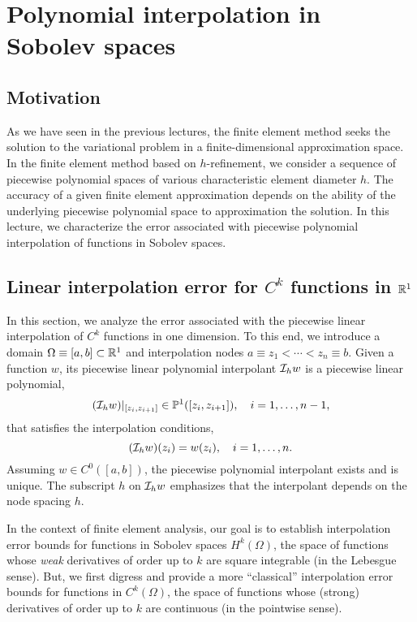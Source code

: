 \chapter{Polynomial interpolation in Sobolev spaces}

\section{Motivation}
As we have seen in the previous lectures, the finite element method seeks the solution to the variational problem in a finite-dimensional approximation space.  In the finite element method based on $h$-refinement, we consider a sequence of piecewise polynomial spaces of various characteristic element diameter $h$.  The accuracy of a given finite element approximation depends on the ability of the underlying piecewise polynomial space to approximation the solution.  In this lecture, we characterize the error associated with piecewise polynomial interpolation of functions in Sobolev spaces.  %


\section{Linear interpolation error for $C^k$ functions in $\mathbb{R}^1$}

\label{sec:fe_interp_1d}
In this section, we analyze the error associated with the piecewise linear interpolation of $C^k$ functions in one dimension. To this end, we introduce a domain $\Omega \equiv [a,b] \subset \mathbb{R}^1$ and interpolation nodes $a \equiv z_1 < \cdots < z_n \equiv b$.  Given a function $w$, its piecewise linear polynomial interpolant $\mathcal{I}_h w$ is a piecewise linear polynomial,
\begin{equation*}
  (\mathcal{I}_h w)|_{[z_i,z_{i+1}]} \in \mathbb{P}^1([z_i,z_{i+1}]), \quad i = 1,\dots,n-1,
\end{equation*}
that satisfies the interpolation conditions,
\begin{equation*}
  (\mathcal{I}_h w)(z_i) = w(z_i), \quad i = 1,\dots,n.
\end{equation*}
Assuming $w \in C^0([a,b])$, the piecewise polynomial interpolant exists and is unique.  The subscript $h$ on $\mathcal{I}_h w$ emphasizes that the interpolant depends on the node spacing $h$.

In the context of finite element analysis,  our goal is to establish interpolation error bounds for functions in Sobolev spaces $H^k(\Omega)$, the space of functions whose \emph{weak} derivatives of order up to $k$ are square integrable (in the Lebesgue sense).  But, we first digress and provide a more ``classical'' interpolation error bounds for functions in $C^k(\Omega)$, the space of functions whose (strong) derivatives of order up to $k$ are continuous (in the pointwise sense).

